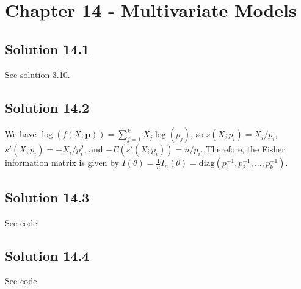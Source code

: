 \section*{Chapter 14 - Multivariate Models}

\subsection*{Solution 14.1}

See solution 3.10.


\subsection*{Solution 14.2}

We have $\log(f(X;\bm{p})) = \sum_{j = 1}^k X_j \log(p_j)$, so $s(X;p_i) = X_i/p_i$, $s'(X;p_i) = -X_i/p_i^2$, and $-E(s'(X;p_i)) = n/p_i$.
Therefore, the Fisher information matrix is given by $I(\theta) = \frac{1}{n} I_n(\theta) = \mathrm{diag}(p_1^{-1}, p_2^{-1}, ..., p_k^{-1})$.


\subsection*{Solution 14.3}

See code.


\subsection*{Solution 14.4}

See code.
